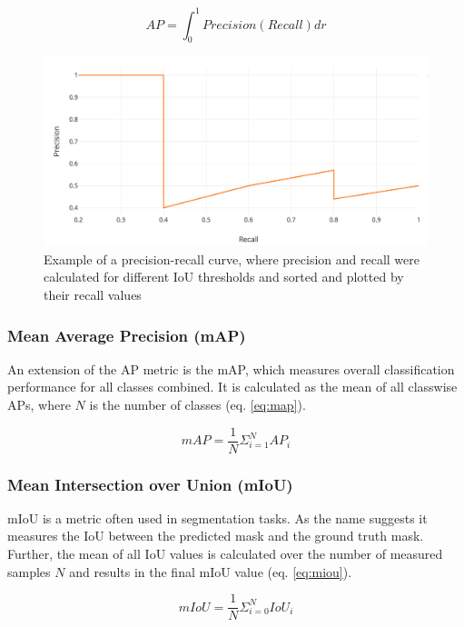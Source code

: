 \begin{equation}
    AP = \int_0^1 Precision(Recall) dr
    \label{eq:ap}
\end{equation}

\begin{figure}
\begin{center}
    \includegraphics[width=14cm]{imgs/pr_curve.png}
    \caption{Example of a precision-recall curve, where precision and recall were calculated for different \ac{IoU} thresholds and sorted and plotted by their recall values \cite{map_article}}
    \label{fig:pr_curve}
\end{center}
\end{figure}

\subsubsection{Mean Average Precision (mAP)}

An extension of the \ac{AP} metric is the \ac{mAP}, which measures overall classification performance for all classes combined.
It is calculated as the mean of all classwise \acp{AP}, where $N$ is the number of classes (eq. \ref{eq:map}).

\begin{equation}
    mAP = \frac{1}{N} \Sigma_{i=1}^N AP_i
    \label{eq:map}
\end{equation}

\subsubsection{Mean Intersection over Union (mIoU)}

\ac{mIoU} is a metric often used in segmentation tasks.
As the name suggests it measures the \ac{IoU} between the predicted mask and the ground truth mask.
Further, the mean of all \ac{IoU} values is calculated over the number of measured samples $N$ and results in the final \ac{mIoU} value (eq. \ref{eq:miou}).

\begin{equation}
    mIoU = \frac{1}{N} \Sigma_{i=0}^{N} IoU_i
    \label{eq:miou}
\end{equation}
